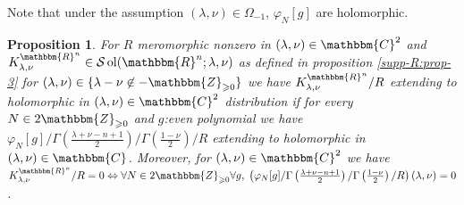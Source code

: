 \documentclass{article}
\newcommand{\nin}{\not\in}
\newcommand{\tmop}[1]{\ensuremath{\operatorname{#1}}}
\numberwithin{definition}{section}
\numberwithin{lemma}{section}
\newtheorem{proposition}{Proposition}
\numberwithin{proposition}{section}
{\theorembodyfont{\rmfamily}\newtheorem{remark}{Remark}
\numberwithin{remark}{section}
}
\begin{document}
\begin{remark}
  Note that under the assumption $( \lambda, \nu) \in \Omega_{- 1}$,
  $\varphi_N [ g]$ are holomorphic.
\end{remark}

\begin{proposition}
  \label{k-finite:prop-KR-hook-2}For $R$ meromorphic nonzero in $( \lambda,
  \nu) \in \mathbbm{C}^2$ and $K_{\lambda, \nu}^{\mathbbm{R}^n} \in
  \mathcal{S} \tmop{ol} ( \mathbbm{R}^n ; \lambda, \nu)$ as defined in
  proposition \ref{supp-R:prop-3} for $( \lambda, \nu) \in \{ \lambda - \nu
  \nin -\mathbbm{Z}_{\geqslant 0} \}$ we have $K_{\lambda,
  \nu}^{\mathbbm{R}^n} / R$ extending to holomorphic in $( \lambda, \nu) \in
  \mathbbm{C}^2$ distribution if for every $N \in 2\mathbbm{Z}_{\geqslant 0}$
  and $g$:even polynomial we have $\varphi_N [ g] / \Gamma \left(
  \frac{\lambda + \nu - n + 1}{2} \right) / \Gamma \left( \frac{1 - \nu}{2}
  \right) / R$ extending to holomorphic in $( \lambda, \nu) \in \mathbbm{C}$.
  Moreover, for $( \lambda, \nu) \in \mathbbm{C}^2$ we have $K_{\lambda,
  \nu}^{\mathbbm{R}^n} / R = 0 \Leftrightarrow \forall N \in
  2\mathbbm{Z}_{\geqslant 0} \forall g, \; \left( \varphi_N [ g] / \Gamma
  \left( \frac{\lambda + \nu - n + 1}{2} \right) / \Gamma \left( \frac{1 -
  \nu}{2} \right) / R \right) ( \lambda, \nu) = 0$.
\end{proposition}
\end{document}
